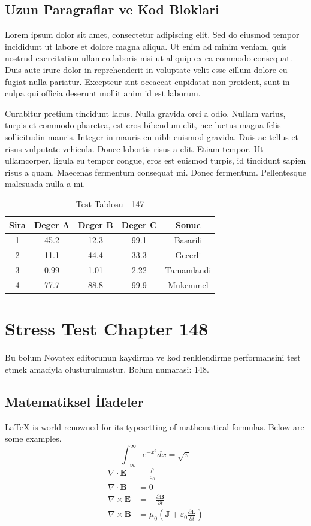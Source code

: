 \documentclass[12pt,a4paper]{article}
\begin{document}
\subsection{Uzun Paragraflar ve Kod Bloklari}
Lorem ipsum dolor sit amet, consectetur adipiscing elit. Sed do eiusmod tempor incididunt ut labore et dolore magna aliqua. Ut enim ad minim veniam, quis nostrud exercitation ullamco laboris nisi ut aliquip ex ea commodo consequat. Duis aute irure dolor in reprehenderit in voluptate velit esse cillum dolore eu fugiat nulla pariatur. Excepteur sint occaecat cupidatat non proident, sunt in culpa qui officia deserunt mollit anim id est laborum.

Curabitur pretium tincidunt lacus. Nulla gravida orci a odio. Nullam varius, turpis et commodo pharetra, est eros bibendum elit, nec luctus magna felis sollicitudin mauris. Integer in mauris eu nibh euismod gravida. Duis ac tellus et risus vulputate vehicula. Donec lobortis risus a elit. Etiam tempor. Ut ullamcorper, ligula eu tempor congue, eros est euismod turpis, id tincidunt sapien risus a quam. Maecenas fermentum consequat mi. Donec fermentum. Pellentesque malesuada nulla a mi.

\begin{table}[h!]
\centering
\begin{tabular}{|c|c|c|c|c|}
\hline
\textbf{Sira} & \textbf{Deger A} & \textbf{Deger B} & \textbf{Deger C} & \textbf{Sonuc} \\
\hline
1 & 45.2 & 12.3 & 99.1 & Basarili \\
2 & 11.1 & 44.4 & 33.3 & Gecerli \\
3 & 0.99 & 1.01 & 2.22 & Tamamlandi \\
4 & 77.7 & 88.8 & 99.9 & Mukemmel \\
\hline
\end{tabular}
\caption{Test Tablosu - 147}
\end{table}

\newpage
\section{Stress Test Chapter 148}
Bu bolum Novatex editorunun kaydirma ve kod renklendirme performansini test etmek amaciyla olusturulmustur. Bolum numarasi: 148.

\subsection{Matematiksel İfadeler}
\LaTeX{} is world-renowned for its typesetting of mathematical formulas. Below are some examples.
\begin{equation}
\int_{-\infty}^{\infty} e^{-x^2} dx = \sqrt{\pi}
\end{equation}
\begin{align}
\nabla \cdot \mathbf{E} &= \frac{\rho}{\varepsilon_0} \\
\nabla \cdot \mathbf{B} &= 0 \\
\nabla \times \mathbf{E} &= -\frac{\partial \mathbf{B}}{\partial t} \\
\nabla \times \mathbf{B} &= \mu_0\left(\mathbf{J} + \varepsilon_0 \frac{\partial \mathbf{E}}{\partial t}\right)
\end{align}
\end{document}

